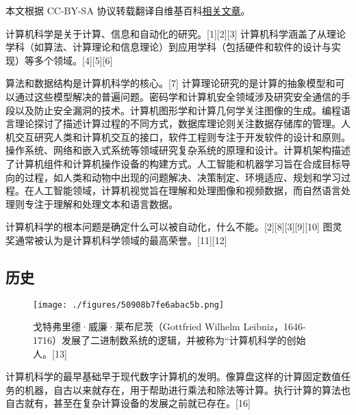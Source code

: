 
本文根据 CC-BY-SA 协议转载翻译自维基百科\href{https://en.wikipedia.org/wiki/Computer_science}{相关文章}。

计算机科学是关于计算、信息和自动化的研究。[1][2][3] 计算机科学涵盖了从理论学科（如算法、计算理论和信息理论）到应用学科（包括硬件和软件的设计与实现）等多个领域。[4][5][6]

算法和数据结构是计算机科学的核心。[7] 计算理论研究的是计算的抽象模型和可以通过这些模型解决的普遍问题。密码学和计算机安全领域涉及研究安全通信的手段以及防止安全漏洞的技术。计算机图形学和计算几何学关注图像的生成。编程语言理论探讨了描述计算过程的不同方式，数据库理论则关注数据存储库的管理。人机交互研究人类和计算机交互的接口，软件工程则专注于开发软件的设计和原则。操作系统、网络和嵌入式系统等领域研究复杂系统的原理和设计。计算机架构描述了计算机组件和计算机操作设备的构建方式。人工智能和机器学习旨在合成目标导向的过程，如人类和动物中出现的问题解决、决策制定、环境适应、规划和学习过程。在人工智能领域，计算机视觉旨在理解和处理图像和视频数据，而自然语言处理则专注于理解和处理文本和语言数据。

计算机科学的根本问题是确定什么可以被自动化，什么不能。[2][8][3][9][10] 图灵奖通常被认为是计算机科学领域的最高荣誉。[11][12]
\subsection{历史}
\begin{figure}[ht]
\centering
\texttt{[image: ./figures/50908b7fe6abac5b.png]}
\caption{戈特弗里德·威廉·莱布尼茨（Gottfried Wilhelm Leibniz，1646-1716）发展了二进制数系统的逻辑，并被称为“计算机科学的创始人。[13]} \label{fig_JSS_1}
\end{figure}
计算机科学的最早基础早于现代数字计算机的发明。像算盘这样的计算固定数值任务的机器，自古以来就存在，用于帮助进行乘法和除法等计算。执行计算的算法也自古就有，甚至在复杂计算设备的发展之前就已存在。[16]

